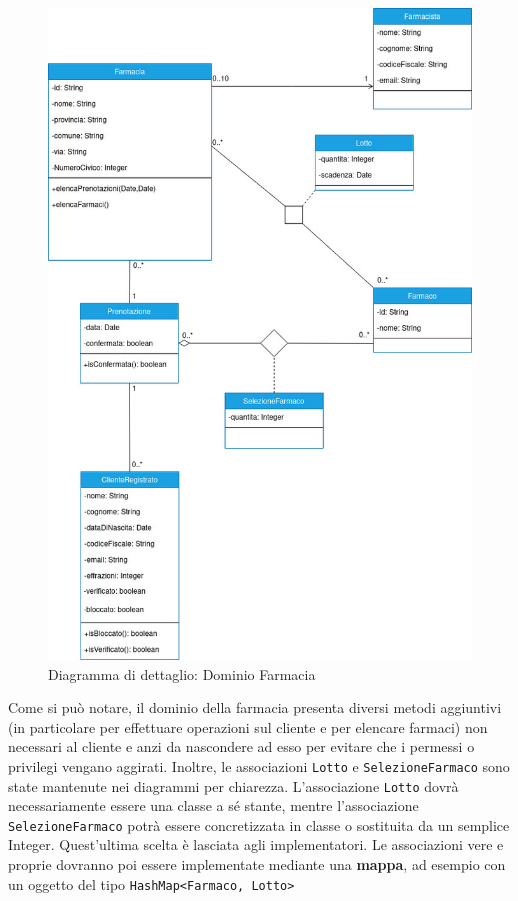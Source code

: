 \begin{figure}[h!]
    \begin{center}
        \includegraphics[scale=0.56]{immagini/DominioFarmacia-progettazione.jpg}
        \caption{Diagramma di dettaglio: Dominio Farmacia}
    \end{center}
\end{figure}

\newpage

Come si può notare, il dominio della farmacia presenta diversi metodi aggiuntivi (in particolare per effettuare operazioni sul cliente e per elencare farmaci)
non necessari al cliente e anzi da nascondere ad esso per evitare che i permessi o privilegi vengano aggirati.
Inoltre, le associazioni \texttt{Lotto} e \texttt{SelezioneFarmaco} sono state mantenute nei diagrammi per chiarezza. 
L'associazione \texttt{Lotto} dovrà necessariamente essere una classe a sé stante,
mentre l'associazione \texttt{SelezioneFarmaco} potrà essere concretizzata in classe o sostituita da un semplice Integer. Quest'ultima scelta è lasciata agli implementatori.
Le associazioni vere e proprie dovranno poi essere implementate mediante una \textbf{mappa}, ad esempio con un oggetto del tipo \mbox{\texttt{HashMap<Farmaco, Lotto>}}

